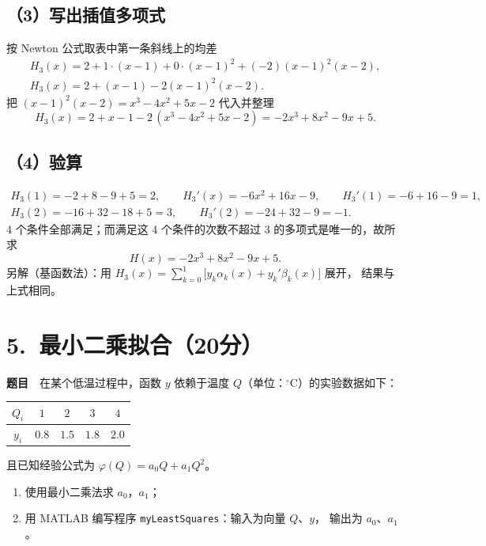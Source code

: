 \documentclass[a4paper,11pt]{ctexart}
\begin{document}
\subsection*{（3）写出插值多项式}
按 Newton 公式取表中第一条斜线上的均差
\begin{gather*}
  H_3(x)=2+1\cdot(x-1)+0\cdot(x-1)^{2}+(-2)(x-1)^{2}(x-2),\\
  H_3(x)=2+(x-1)-2(x-1)^{2}(x-2).
\end{gather*}
把 $(x-1)^{2}(x-2)=x^{3}-4x^{2}+5x-2$ 代入并整理
\[
  H_3(x)=2+x-1-2\,(x^{3}-4x^{2}+5x-2)=-2x^{3}+8x^{2}-9x+5 .
\]

\subsection*{（4）验算}
\begin{gather*}
  H_3(1)=-2+8-9+5=2,\qquad H_3'(x)=-6x^{2}+16x-9,\qquad
  H_3'(1)=-6+16-9=1,\\
  H_3(2)=-16+32-18+5=3,\qquad H_3'(2)=-24+32-9=-1 .
\end{gather*}
4 个条件全部满足；而满足这 4 个条件的次数不超过 3 的多项式是唯一的，故所求
\[
  H(x)=-2x^{3}+8x^{2}-9x+5 .
\]
{\small 另解（基函数法）：用
$H_3(x)=\sum_{k=0}^{1}\bigl[y_k\alpha_k(x)+y_k'\beta_k(x)\bigr]$ 展开，
结果与上式相同。}

\section*{5.\ 最小二乘拟合（20分）}

\textbf{题目}　在某个低温过程中，函数 $y$ 依赖于温度 $Q$（单位：$^\circ$C）的实验数据如下：
\begin{center}
  \begin{tabular}{ccccc}
    \toprule
    $Q_i$ & $1$ & $2$ & $3$ & $4$ \\
    \midrule
    $y_i$ & $0.8$ & $1.5$ & $1.8$ & $2.0$ \\
    \bottomrule
  \end{tabular}
\end{center}
且已知经验公式为 $\varphi(Q)=a_0Q+a_1Q^{2}$。
\begin{enumerate}\setlength{\itemsep}{0.15em}
  \item 使用最小二乘法求 $a_0$，$a_1$；
  \item 用 MATLAB 编写程序 \texttt{myLeastSquares}：输入为向量 $Q$、$y$，
        输出为 $a_0$、$a_1$。
\end{enumerate}
\end{document}
